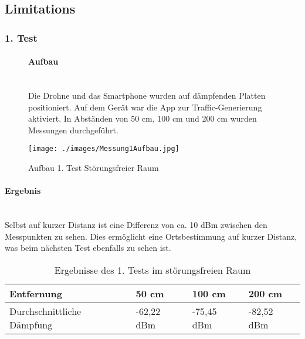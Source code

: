 \documentclass[a4paper]{spie}  %
\begin{document}
\subsection{Limitations}
\subsubsection{1. Test}

\begin{figure}[H]
\begin{minipage}[t]{0.4\textwidth}
\vspace{0pt}
\paragraph{Aufbau}\mbox{}\\
Die Drohne und das Smartphone wurden auf dämpfenden Platten positioniert. Auf dem Gerät war die App zur Traffic-Generierung aktiviert. In Abständen von 50 cm, 100 cm und 200 cm wurden Messungen durchgeführt.

\end{minipage}
\hfill
\begin{minipage}[t]{0.5\textwidth}
\vspace{0pt}
		\texttt{[image: ./images/Messung1Aufbau.jpg]}
		\caption{Aufbau 1. Test Störungsfreier Raum}
		\label{fig:test1}
\end{minipage}
\end{figure}

\paragraph{Ergebnis}\mbox{}\\
Selbst auf kurzer Distanz ist eine Differenz von ca. 10 dBm zwischen den Messpunkten zu sehen. Dies ermöglicht eine Ortsbestimmung auf kurzer Distanz, was beim nächsten Test ebenfalls zu sehen ist.

\begin{table}[H]
\centering
	\begin{tabular}{ | p{2.5cm} | l | l | l | }
		\hline 
		Entfernung	& 50 cm	& 100 cm	& 200 cm	\\ \hline
		Durchschnittliche Dämpfung & -62,22 dBm	& -75,45 dBm	& -82,52 dBm \\
		\hline
	\end{tabular}
	\caption{Ergebnisse des 1. Tests im störungsfreien Raum}
	\label{tab:probeTab}
\end{table}
\end{document}
